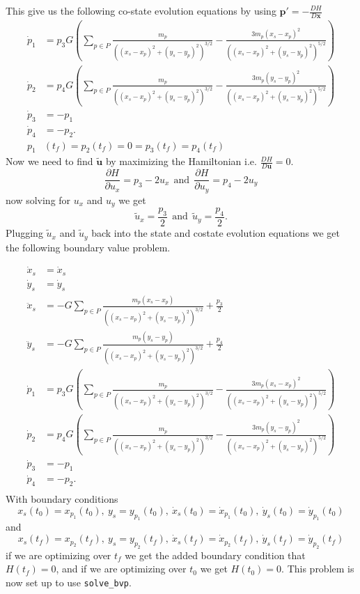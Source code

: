 \documentclass[11pt]{amsart}
\begin{document}
This give us the following co-state evolution equations by using $\mathbf{p}' = -\frac{DH}{D\mathbf{x}}$
\begin{align*}
    \dot{p}_1 &= p_3G\left(\sum_{p\in{P}}^{}\frac{m_p}{((x_s-x_p)^2+(y_s-y_p)^2)^{3/2}} - \frac{3m_p(x_s - x_p)^2}{((x_s-x_p)^2+(y_s-y_p)^2)^{5/2}}\right) \\
    \dot{p}_2 &= p_4G\left(\sum_{p\in{P}}^{}\frac{m_p}{((x_s-x_p)^2+(y_s-y_p)^2)^{3/2}} - \frac{3m_p(y_s - y_p)^2}{((x_s-x_p)^2+(y_s-y_p)^2)^{5/2}}\right) \\
    \dot{p}_3 &= -p_1 \\
    \dot{p}_4 &= -p_2. \\
    p_1&(t_f)= p_2(t_f) = 0 = p_3(t_f) = p_4(t_f)
\end{align*}
Now we need to find $\tilde{\mathbf{u}}$ by maximizing the Hamiltonian i.e. $\frac{DH}{D\mathbf{u}} = 0$.
\[\frac{\partial H}{\partial u_x} = p_3 - 2u_x \:\:\text{and}\:\: \frac{\partial H}{\partial u_y} = p_4 - 2u_y\]
now solving for $u_x$ and $u_y$ we get
\[\tilde{u}_x = \frac{p_3}{2} \:\:\text{and}\:\: \tilde{u}_y = \frac{p_4}{2}.\]
Plugging $\tilde{u}_x$ and $\tilde{u}_y$ back into the state and costate evolution equations we get the following boundary value problem.

\begin{align*}
    \dot{x}_s &= \dot{x}_s \\
    \dot{y}_s &= \dot{y}_s \\
    \ddot{x}_s &= -G\sum_{p\in{P}}^{}\frac{m_p(x_s - x_p)}{((x_s-x_p)^2+(y_s-y_p)^2)^{3/2}} + \frac{p_3}{2} \\
    \ddot{y}_s &= -G\sum_{p\in{P}}^{}\frac{m_p(y_s - y_p)}{((x_s-x_p)^2+(y_s-y_p)^2)^{3/2}} + \frac{p_4}{2} \\
    \dot{p}_1 &= p_3G\left(\sum_{p\in{P}}^{}\frac{m_p}{((x_s-x_p)^2+(y_s-y_p)^2)^{3/2}} - \frac{3m_p(x_s - x_p)^2}{((x_s-x_p)^2+(y_s-y_p)^2)^{5/2}}\right) \\
    \dot{p}_2 &= p_4G\left(\sum_{p\in{P}}^{}\frac{m_p}{((x_s-x_p)^2+(y_s-y_p)^2)^{3/2}} - \frac{3m_p(y_s - y_p)^2}{((x_s-x_p)^2+(y_s-y_p)^2)^{5/2}}\right) \\
    \dot{p}_3 &= -p_1 \\
    \dot{p}_4 &= -p_2. \\
\end{align*}
With boundary conditions
\[x_s(t_0) = x_{p_1}(t_0),\:y_s = y_{p_1}(t_0),\:\dot{x}_s(t_0) = \dot{x}_{p_1}(t_0),\:\dot{y}_s(t_0) = \dot{y}_{p_1}(t_0)\]
and 
\[x_s(t_f) = x_{p_2}(t_f),\:y_s = y_{p_2}(t_f),\:\dot{x}_s(t_f) = \dot{x}_{p_2}(t_f),\:\dot{y}_s(t_f) = \dot{y}_{p_2}(t_f)\]
if we are optimizing over $t_f$ we get the added boundary condition that $H(t_f) = 0$, and if we are optimizing over $t_0$ we get $H(t_0)=0$. This problem is now set up to use \lstinline{solve_bvp}.
\end{document}

